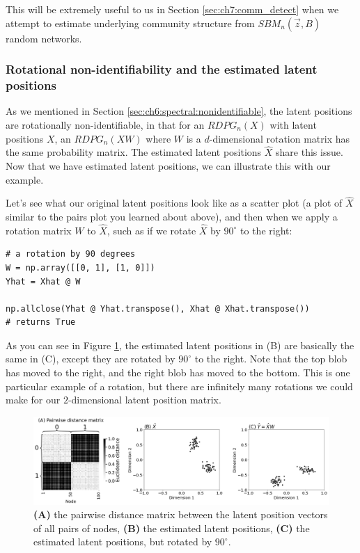 This will be extremely useful to us in Section \ref{sec:ch7:comm_detect} when we attempt to estimate underlying community structure from $SBM_n(\vec z, B)$ random networks.

\subsubsection{Rotational non-identifiability and the estimated latent positions}

As we mentioned in Section \ref{sec:ch6:spectral:nonidentifiable}, the latent positions are rotationally non-identifiable, in that for an $RDPG_n(X)$ with latent positions $X$, an $RDPG_n(XW)$ where $W$ is a $d$-dimensional rotation matrix has the same probability matrix. The estimated latent positions $\hat X$ share this issue. Now that we have estimated latent positions, we can illustrate this with our example. 

Let's see what our original latent positions look like as a scatter plot (a plot of $\hat X$ similar to the pairs plot you learned about above), and then when we apply a rotation matrix $W$ to $\hat X$, such as if we rotate $\hat X$ by $90^\circ$ to the right:

\begin{lstlisting}[style=python]
# a rotation by 90 degrees
W = np.array([[0, 1], [1, 0]])
Yhat = Xhat @ W

np.allclose(Yhat @ Yhat.transpose(), Xhat @ Xhat.transpose())
# returns True
\end{lstlisting}

As you can see in Figure \ref{fig:ch6:ase:nonidentifiable}, the estimated latent positions in (B) are basically the same in (C), except they are rotated by $90^\circ$ to the right. Note that the top blob has moved to the right, and the right blob has moved to the bottom. This is one particular example of a rotation, but there are infinitely many rotations we could make for our $2$-dimensional latent position matrix.

\begin{figure}[h]
    \centering
    \includegraphics[width=\linewidth]{representations/ch6/Images/rotation.png}
    \caption[Pairwise distance matrices for latent positions]{\textbf{(A)} the pairwise distance matrix between the latent position vectors of all pairs of nodes, \textbf{(B)} the estimated latent positions, \textbf{(C)} the estimated latent positions, but rotated by $90^\circ$.}
    \label{fig:ch6:ase:nonidentifiable}
\end{figure}


